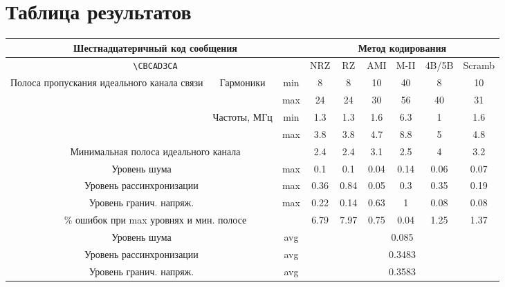 \documentclass[12pt, a4paper] {ncc}
\begin{document}
\section*{Таблица результатов}

\begin{tabular}{|c|c|c|c|c|c|c|c|c|}
        \hline
        \multicolumn{3}{|c|}{Шестнадцатеричный код сообщения} & \multicolumn{6}{c|}{Метод кодирования} \\
        \hline
        \multicolumn{3}{|c|}{\texttt{\textbackslash CBCAD3CA}} & NRZ & RZ & AMI & M-II & 4B/5B & Scramb \\
        \hline
        \multirow{4}{80pt}{Полоса пропускания идеального канала связи} & \multirow{2}{*}{Гармоники}
          & min &
          8  & 8  & 10 & 40  &  8 & 10  \\
          \cline{3-9} & & max &
          24 & 24 & 30 &  56 &  40 & 31 \\
          \cline{2-9}
        & \multirow{2}{*}{Частоты, МГц} & min &
           1.3  & 1.3 & 1.6 & 6.3 & 1 & 1.6 \\
          \cline{3-9}
            & & max &
           3.8 &  3.8 & 4.7 & 8.8 & 5  & 4.8 \\
          \cline{2-9}
        \hline
        \multicolumn{3}{|c|}{Минимальная полоса идеального канала} &
          2.4 &  2.4  &  3.1 &  2.5 & 4 & 3.2 \\
        \hline
        \multicolumn{2}{|c|}{Уровень шума} & max &
          0.1 &  0.1 &  0.04 &  0.14 & 0.06 & 0.07 \\
        \hline
        \multicolumn{2}{|c|}{Уровень рассинхронизации} & max &
          0.36 &  0.84 &  0.05 & 0.3 & 0.35& 0.19 \\
        \hline
        \multicolumn{2}{|c|}{Уровень гранич. напряж.} & max &
          0.22 &  0.14 &  0.63 &  1 &  0.08 & 0.08 \\
        \hline
        \multicolumn{3}{|c|}{\% ошибок при max уровнях и мин. полосе} &
          6.79 & 7.97 & 0.75 &  0.04 &  1.25 & 1.37 \\
        \hline
        \multicolumn{2}{|c|}{Уровень шума} & avg &
        \multicolumn{6}{c|}{0.085}\\
        \hline
        \multicolumn{2}{|c|}{Уровень рассинхронизации} & avg &
        \multicolumn{6}{c|}{0.3483} \\
        \hline
        \multicolumn{2}{|c|}{Уровень гранич. напряж.} & avg &
        \multicolumn{6}{c|}{0.3583} \\
        \hline

\end{tabular}
\end{document}
